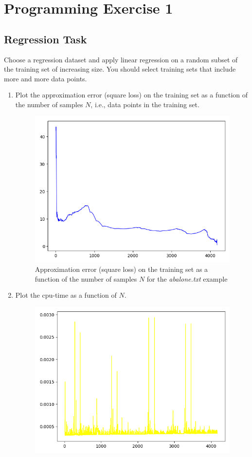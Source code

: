 \documentclass[12pt,letterpaper]{article}
\begin{document}
\section*{Programming Exercise 1}
\subsection*{Regression Task}
Choose a regression dataset and apply linear regression on a random subset of the training set of increasing size. You should select training sets that include more and more data points.
\begin{enumerate}[leftmargin=!,labelindent=5pt]
    \item Plot the approximation error (square loss) on the training set as a function of the number of samples $N$, i.e., data points in the training set.
        \begin{figure}[H]
            \centering
            \includegraphics[width=15cm]{images/error.jpg}
            \caption{Approximation error (square loss) on the training set as a function of the number of samples $N$ for the \textit{abalone.txt} example}
            \label{fig:1}
        \end{figure}
    \newpage
    \item Plot the cpu-time as a function of $N$.
        \begin{figure}[H]
            \centering
            \includegraphics[width=15cm]{images/time.jpg}

\end{figure}
\end{enumerate}
\end{document}

